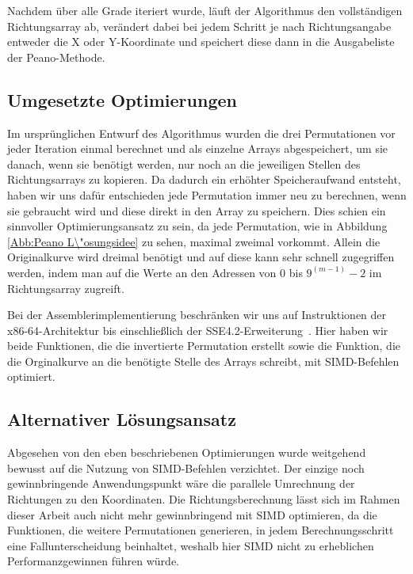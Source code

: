 \documentclass[course=asp]{aspdoc}
\begin{document}
Nachdem \"uber alle Grade iteriert wurde, l\"auft der Algorithmus den vollst\"andigen Richtungsarray ab, ver\"andert dabei bei jedem Schritt je nach Richtungsangabe entweder die X oder Y-Koordinate und speichert diese dann in die Ausgabeliste der Peano-Methode.

\subsection{Umgesetzte Optimierungen} \label{Umgesetzte Optimierungen}

Im urspr\"unglichen Entwurf des Algorithmus wurden die drei Permutationen vor jeder Iteration einmal berechnet und als einzelne Arrays abgespeichert, um sie danach, wenn sie ben\"otigt werden, nur noch an die jeweiligen Stellen des Richtungsarrays zu kopieren. Da dadurch ein erh\"ohter Speicheraufwand entsteht, haben wir uns daf\"ur entschieden jede Permutation immer neu zu berechnen, wenn sie gebraucht wird und diese direkt in den Array zu speichern. Dies schien ein sinnvoller Optimierungsansatz zu sein, da jede Permutation, wie in Abbildung \ref{Abb:Peano L\"osungsidee} zu sehen, maximal zweimal vorkommt. Allein die Originalkurve wird dreimal ben\"otigt und auf diese kann sehr schnell zugegriffen werden, indem man auf die Werte an den Adressen von $0$ bis $9^{(m - 1)} - 2$ im Richtungsarray zugreift. 

Bei der Assemblerimplementierung beschr\"anken wir uns auf Instruktionen der x86-64-Architektur bis einschlie\ss lich der SSE4.2-Erweiterung~\cite{intel2020man}. Hier haben wir beide Funktionen, die die invertierte Permutation erstellt sowie die Funktion, die die Orginalkurve an die ben\"otigte Stelle des Arrays schreibt, mit SIMD-Befehlen optimiert. 


\subsection{Alternativer L\"osungsansatz} \label{Alternativer L\"osungsansatz}

Abgesehen von den eben beschriebenen Optimierungen wurde weitgehend bewusst auf die Nutzung von SIMD-Befehlen verzichtet. Der einzige noch gewinnbringende Anwendungspunkt w\"are die parallele Umrechnung der Richtungen zu den Koordinaten. Die Richtungsberechnung l\"asst sich im Rahmen dieser Arbeit auch nicht mehr gewinnbringend mit SIMD optimieren, da die Funktionen, die weitere Permutationen generieren, in jedem Berechnungsschritt eine Fallunterscheidung beinhaltet, weshalb hier SIMD nicht zu erheblichen Performanzgewinnen f\"uhren w\"urde. 
\end{document}
